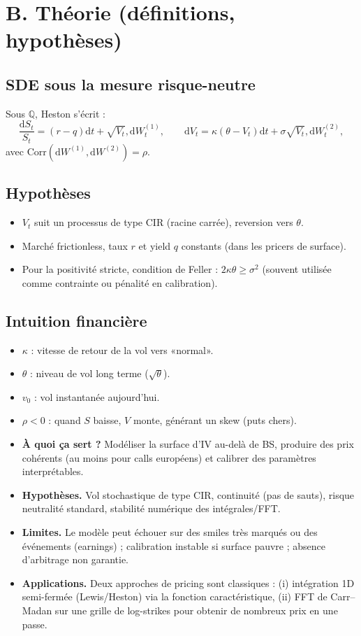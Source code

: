 \documentclass[11pt,a4paper]{report}
\theoremstyle{definition}
\theoremstyle{plain}
\theoremstyle{remark}
\newcommand{\dd}{\mathrm{d}}
\newcommand{\Corr}{\mathrm{Corr}}
\newcommand{\1}{\mathbf{1}}
\newcommand{\Qmeas}{\mathbb{Q}}
\newcommand{\qa}[4]{
\begin{itemize}[leftmargin=*]
\item \textbf{À quoi ça sert ?} #1
\item \textbf{Hypothèses.} #2
\item \textbf{Limites.} #3
\item \textbf{Applications.} #4
\end{itemize}
}
\begin{document}
\section{B. Théorie (définitions, hypothèses)}
\subsection*{SDE sous la mesure risque-neutre}
Sous $\Qmeas$, Heston s'écrit :
\[
\frac{\dd S_t}{S_t}=(r-q)\dd t+\sqrt{V_t},\dd W_t^{(1)},\qquad
\dd V_t=\kappa(\theta - V_t)\dd t+\sigma\sqrt{V_t},\dd W_t^{(2)},
\]
avec $\Corr(\dd W^{(1)},\dd W^{(2)})=\rho$.

\subsection*{Hypothèses}
\begin{itemize}[leftmargin=*]
\item $V_t$ suit un processus de type CIR (racine carrée), reversion vers $\theta$.
\item Marché frictionless, taux $r$ et yield $q$ constants (dans les pricers de surface).
\item Pour la positivité stricte, condition de Feller : $2\kappa\theta\ge\sigma^2$ (souvent utilisée comme contrainte ou pénalité en calibration).
\end{itemize}

\subsection*{Intuition financière}
\begin{itemize}[leftmargin=*]
\item $\kappa$ : vitesse de retour de la vol vers «normal».
\item $\theta$ : niveau de vol long terme ($\sqrt{\theta}$).
\item $v_0$ : vol instantanée aujourd'hui.
\item $\rho<0$ : quand $S$ baisse, $V$ monte, générant un skew (puts chers).
\end{itemize}

\qa
{Modéliser la surface d'IV au-delà de BS, produire des prix cohérents (au moins pour calls européens) et calibrer des paramètres interprétables.}
{Vol stochastique de type CIR, continuité (pas de sauts), risque neutralité standard, stabilité numérique des intégrales/FFT.}
{Le modèle peut échouer sur des smiles très marqués ou des événements (earnings) ; calibration instable si surface pauvre ; absence d'arbitrage non garantie.}
{Deux approches de pricing sont classiques : (i) intégration 1D semi-fermée (Lewis/Heston) via la fonction caractéristique, (ii) FFT de Carr--Madan sur une grille de log-strikes pour obtenir de nombreux prix en une passe.}
\end{document}
